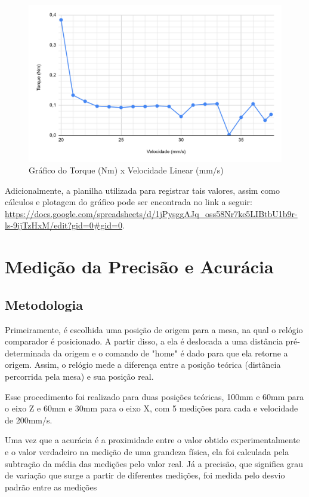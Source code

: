 \begin{figure}[H]
    \centering
    \includegraphics[width=0.85\linewidth]{images/Eletrica/Figura12.png}
    \caption{Gráfico do Torque (Nm) x Velocidade Linear (mm/s)}
    \label{fig:curva-motor}
\end{figure}

Adicionalmente, a planilha utilizada para registrar tais valores, assim como cálculos e plotagem do gráfico pode ser encontrada no link a seguir:  \url{https://docs.google.com/spreadsheets/d/1jPysggAJq_oss58Nr7ke5LIBtbU1b9r-ls-9ijTzHxM/edit?gid=0#gid=0}.


\section{Medição da Precisão e Acurácia}
\subsection{Metodologia} 
Primeiramente, é escolhida uma posição de origem para a mesa, na qual o relógio comparador é posicionado. A partir disso, a ela é deslocada a uma distância pré-determinada da origem e o comando de "home" é dado para que ela retorne a origem. Assim, o relógio mede a diferença entre a posição teórica (distância percorrida pela mesa) e sua posição real.

Esse procedimento foi realizado para duas posições teóricas, 100mm e 60mm para o eixo Z e 60mm e 30mm para o eixo X, com 5 medições para cada e velocidade de 200mm/s.

Uma vez que a acurácia é a proximidade entre o valor obtido experimentalmente e o valor verdadeiro na medição de uma grandeza física, ela foi calculada pela subtração da média das medições pelo valor real. Já a precisão, que significa grau de variação que surge a partir de diferentes medições, foi medida pelo desvio padrão entre as medições

